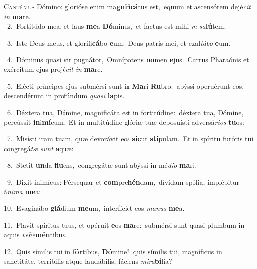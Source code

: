 \lettrine{\initial\textcolor{\initialcolor}{C}}{antémus} Dómino: glorióse enim ma\-\textbf{gni}\-fi\-\textbf{cá}\-tus est,~\star equum et ascensórem dejé\textit{cit} \textit{in} \textbf{ma}\-re.\\
{\numbfont\textcolor{\numbcolor}{~2.}}~Fortitúdo mea, et laus \textbf{me}\-a \textbf{Dó}\-minus,~\star et factus est mihi \textit{in} \textit{sa}\-\textbf{lú}tem.\par
{\numbfont\textcolor{\numbcolor}{~3.}}~Iste Deus meus, et glorifi\-\textbf{cá}\-bo \textbf{e}\-um:~\star Deus patris mei, et exal\-\textit{tá}\-\textit{bo} \textbf{e}\-um.\par
{\numbfont\textcolor{\numbcolor}{~4.}}~Dóminus quasi vir pugnátor,~\dagger Omnípotens \textbf{no}\-men \textbf{e}\-jus.~\star Currus Pharaónis et exércitum ejus projé\textit{cit} \textit{in} \textbf{ma}\-re.\par
{\numbfont\textcolor{\numbcolor}{~5.}}~Elécti príncipes ejus submérsi sunt in \textbf{Ma}\-ri \textbf{Ru}\-bro:~\star abýssi operuérunt eos, descendérunt in profúndum \textit{qua}\-\textit{si} \textbf{la}\-pis.\par
{\numbfont\textcolor{\numbcolor}{~6.}}~Déxtera tua, Dómine, magnificáta est in fortitúdine:~\dagger déxtera tua, Dómine, percússit \textbf{in}\-i\-\textbf{mí}\-cum.~\star Et in multitúdine glóriæ tuæ deposuísti adversá\-\textit{ri}\-\textit{os} \textbf{tu}\-os:\par
{\numbfont\textcolor{\numbcolor}{~7.}}~Misísti iram tuam, quæ devorávit eos \textbf{sic}\-ut \textbf{stí}\-pulam.~\star Et in spíritu furóris tui congregá\textit{tæ} \textit{sunt} \textbf{a}\-quæ:\par
{\numbfont\textcolor{\numbcolor}{~8.}}~Stetit \textbf{un}\-da \textbf{flu}\-ens,~\star congregátæ sunt abýssi in mé\-\textit{di}\-\textit{o} \textbf{ma}\-ri.\par
{\numbfont\textcolor{\numbcolor}{~9.}}~Dixit inimícus: Pérsequar et \textbf{com}\-pre\-\textbf{hén}\-dam,~\star dívidam spólia, implébitur á\-\textit{ni}\-\textit{ma} \textbf{me}\-a:\par
{\numbfont\textcolor{\numbcolor}{10.}}~Evaginábo \textbf{glá}\-dium \textbf{me}\-um,~\star interfíciet eos \textit{ma}\-\textit{nus} \textbf{me}\-a.\par
{\numbfont\textcolor{\numbcolor}{11.}}~Flavit spíritus tuus, et opéruit \textbf{e}\-os \textbf{ma}\-re:~\star submérsi sunt quasi plumbum in aquis \textit{ve}\-\textit{he}\textbf{mén}tibus.\par
{\numbfont\textcolor{\numbcolor}{12.}}~Quis símilis tui in \textbf{fór}\-tibus, \textbf{Dó}\-mine?~\star quis símilis tui, magníficus in sanctitáte, terríbilis atque laudábilis, fáciens \textit{mi}\-\textit{ra}\textbf{bí}lia?\par
